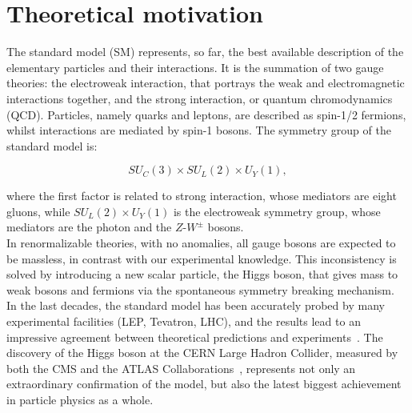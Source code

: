 \chapter{Theoretical motivation}
\label{chap:theory}

The standard model (SM) represents, so far, the best available description of the elementary particles and their interactions. It is the summation of two gauge theories: the electroweak interaction, that portrays the weak and electromagnetic interactions together, and the strong interaction, or quantum chromodynamics (QCD). Particles, namely quarks and leptons, are described as spin-1/2 fermions, whilst interactions are mediated by spin-1 bosons. The symmetry group of the standard model is:

\begin{equation}
SU_{C}(3) \times SU_L (2) \times U_Y (1),
\label{eq:theory_SMgroup}
\end{equation}

\noindent where the first factor is related to strong interaction, whose mediators are eight gluons, while $SU_L (2) \times U_Y (1)$ is the electroweak symmetry group, whose mediators are the photon and the $Z$-$W^{\pm}$ bosons.\\
In renormalizable theories, with no anomalies, all gauge bosons are expected to be massless, in contrast with our experimental knowledge. This inconsistency is solved by introducing a new scalar particle, the Higgs boson, that gives mass to weak bosons and fermions via the spontaneous symmetry breaking mechanism.
\\

\noindent In the last decades, the standard model has been accurately probed by many experimental facilities (LEP, Tevatron, LHC), and the results lead to an impressive agreement between theoretical predictions and experiments~\cite{Baak:2013ppa}. The discovery of the Higgs boson at the CERN Large Hadron Collider, measured by both the CMS and the ATLAS Collaborations~\cite{bib:Aad20121,bib:Chatrchyan201230,bib:Chatrchyan2013lba,Aad:2013xqa,Khachatryan:2014jba,Aad:2014aba,Aad:2015zhl}, represents not only an extraordinary confirmation of the model, but also the latest biggest achievement in particle physics as a whole.

